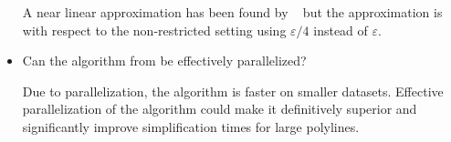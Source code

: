 \begin{itemize}
	A near linear approximation has been found by \citeauthor{near_linear_approx}~\cite{near_linear_approx} but the approximation is with respect to the non-restricted setting using \(\varepsilon/4\) instead of \(\varepsilon\).

	\item Can the algorithm from \citeauthor{polyline_simplification_has_cubic_complexity_bringmannetal} be effectively parallelized?

	Due to parallelization, the \citeauthor{on_optimal_polyline_simplification_using_the_hausdorff_and_frechet_distance} algorithm is faster on smaller datasets. Effective parallelization of the \citeauthor{polyline_simplification_has_cubic_complexity_bringmannetal} algorithm could make it definitively superior and significantly improve simplification times for large polylines.
\end{itemize}
